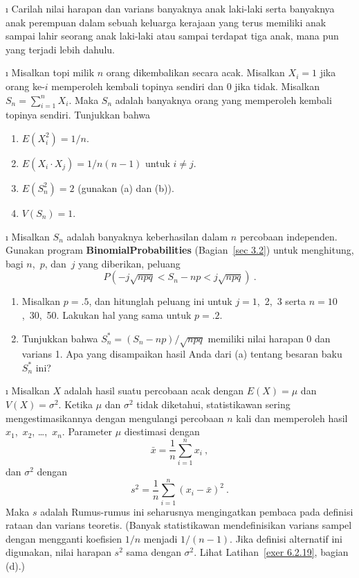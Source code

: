 \begin{LJSItem}
\i\label{exer 6.2.15} Carilah nilai harapan dan varians banyaknya anak laki-laki
serta banyaknya anak perempuan dalam sebuah keluarga kerajaan yang terus memiliki
anak sampai lahir seorang anak laki-laki atau sampai terdapat tiga anak, mana pun yang
terjadi lebih dahulu.

\i\label{exer 6.2.16} Misalkan topi milik $n$ orang dikembalikan secara acak.
Misalkan $X_i = 1$ jika orang ke-$i$ memperoleh kembali topinya sendiri dan 0 jika
tidak.  Misalkan
$S_n =
\sum_{i = 1}^n X_i$.  Maka $S_n$ adalah banyaknya orang yang memperoleh kembali
topinya sendiri.  Tunjukkan bahwa
\begin{enumerate}
\item $E(X_i^2) = 1/n$.

\item $E(X_i \cdot X_j) = 1/n(n - 1)$ untuk $i \ne j$.

\item $E(S_n^2) = 2$ (gunakan (a) dan (b)).

\item $V(S_n) = 1$.
\end{enumerate}

\i\label{exer 6.2.17} Misalkan $S_n$ adalah banyaknya keberhasilan dalam $n$
percobaan independen.  Gunakan program {\bf BinomialProbabilities}
(Bagian~\ref{sec 3.2}) untuk menghitung, bagi $n$,~$p$, dan~$j$ yang diberikan, peluang
$$ P(-j\sqrt{npq} < S_n - np < j\sqrt{npq})\ .
$$
\begin{enumerate}
\item Misalkan $p = .5$, dan hitunglah peluang ini untuk $j = 1$,~2,~3 serta $n =
10$,~30,~50.  Lakukan hal yang sama untuk $p = .2$.

\item Tunjukkan bahwa  $S_n^* = (S_n - np)/\sqrt{npq}$
memiliki nilai harapan 0 dan varians 1.  Apa yang disampaikan hasil Anda dari (a)
tentang besaran baku $S_n^*$ ini?
\end{enumerate}

\i\label{exer 6.2.18} Misalkan $X$ adalah hasil suatu percobaan acak dengan
$E(X) = \mu$ dan $V(X) = \sigma^2$.  Ketika $\mu$ dan $\sigma^2$ tidak diketahui,
statistikawan sering mengestimasikannya dengan mengulangi percobaan $n$ kali dan
memperoleh hasil $x_1$,~$x_2$, \dots,~$x_n$. Parameter $\mu$ diestimasi dengan
$$
\bar{x} = \frac 1n \sum_{i = 1}^n x_i\ ,
$$ dan $\sigma^2$ dengan 
$$ s^2 = \frac 1n \sum_{i = 1}^n (x_i - \bar x)^2\ .
$$ Maka $s$ adalah 
Rumus-rumus ini seharusnya mengingatkan pembaca pada definisi rataan dan varians
teoretis.  (Banyak statistikawan mendefinisikan varians sampel dengan mengganti
koefisien $1/n$ menjadi $1/(n-1)$.  Jika definisi alternatif ini digunakan, nilai
harapan $s^2$ sama dengan $\sigma^2$. Lihat Latihan~\ref{exer 6.2.19}, bagian (d).)


\end{LJSItem}
